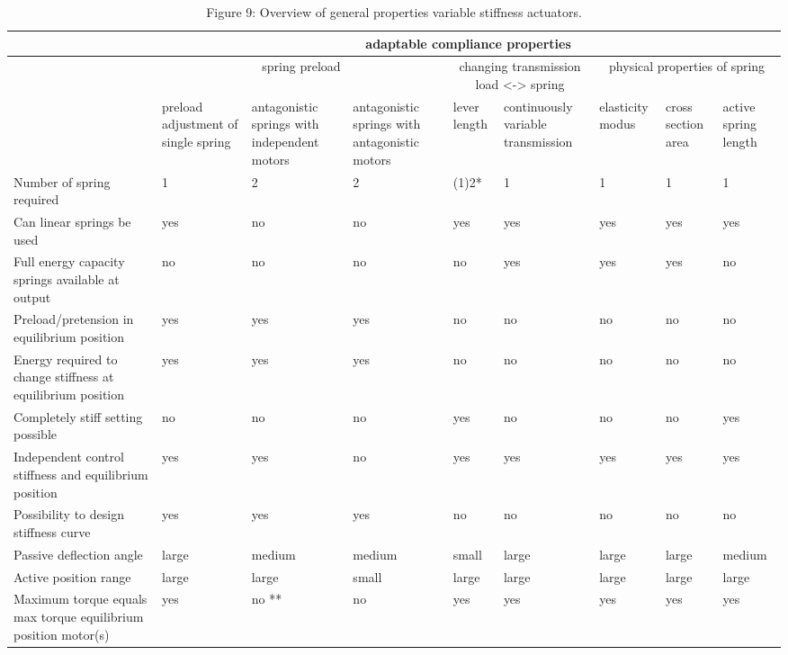 \documentclass[10pt]{article}
\begin{document}
\begin{table}[h]
\begin{center}
\begin{tabular}{|l|l|l|l|l|l|l|l|l|}
\hline
\multirow{3}{*}{} & \multicolumn{8}{|c|}{adaptable compliance properties} \\
\hline
 & \multicolumn{3}{|c|}{spring preload} & \multicolumn{2}{|c|}{changing transmission load <-> spring} & \multicolumn{3}{|c|}{physical properties of spring} \\
\hline
 & preload adjustment of single spring & antagonistic springs with independent motors & antagonistic springs with antagonistic motors & lever length & continuously variable transmission & elasticity modus & cross section area & active spring length \\
\hline
Number of spring required & 1 & 2 & 2 & (1)2* & 1 & 1 & 1 & 1 \\
\hline
Can linear springs be used & yes & no & no & yes & yes & yes & yes & yes \\
\hline
Full energy capacity springs available at output & no & no & no & no & yes & yes & yes & no \\
\hline
Preload/pretension in equilibrium position & yes & yes & yes & no & no & no & no & no \\
\hline
Energy required to change stiffness at equilibrium position & yes & yes & yes & no & no & no & no & no \\
\hline
Completely stiff setting possible & no & no & no & yes & no & no & no & yes \\
\hline
Independent control stiffness and equilibrium position & yes & yes & no & yes & yes & yes & yes & yes \\
\hline
Possibility to design stiffness curve & yes & yes & yes & no & no & no & no & no \\
\hline
Passive deflection angle & large & medium & medium & small & large & large & large & medium \\
\hline
Active position range & large & large & small & large & large & large & large & large \\
\hline
Maximum torque equals max torque equilibrium position motor(s) & yes & no ** & no & yes & yes & yes & yes & yes \\
\hline
\end{tabular}
\captionsetup{labelformat=empty}
\caption{Figure 9: Overview of general properties variable stiffness actuators.}
\end{center}
\end{table}
\end{document}
